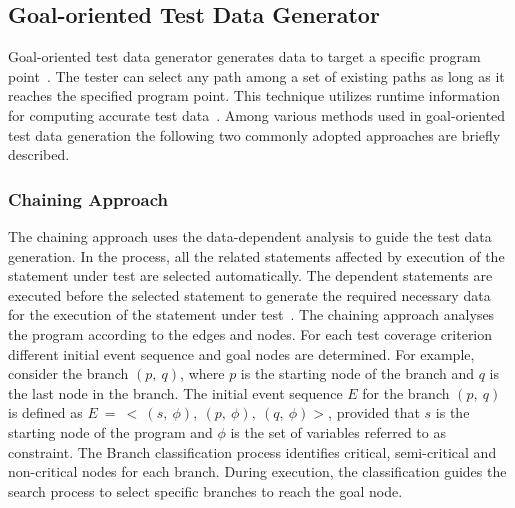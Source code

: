 

\subsection{Goal-oriented Test Data Generator}
\label{sec:goaloriented_2}
Goal-oriented test data generator generates data to target a specific program point~\cite{chungautomated}. The tester can select any path among a set of existing paths as long as it reaches the specified program point. This technique utilizes runtime information for computing accurate test data~\cite{ferguson1996chaining}. Among various methods used in goal-oriented test data generation the following two commonly adopted approaches are briefly described.

\subsubsection{Chaining Approach}
The chaining approach uses the data-dependent analysis to guide the test data generation. In the process, all the related statements affected by execution of the statement under test are selected automatically. The dependent statements are executed before the selected statement to generate the required necessary data for the execution of the statement under test~\cite{ferguson1996chaining}. The chaining approach analyses the program according to the edges and nodes. For each test coverage criterion different initial event sequence and goal nodes are determined. For example, consider  the branch $(p,~q)$, where $p$ is  the starting node of the branch and $q$ is the last node in the branch. The initial event sequence $E$ for the branch $(p,~q)$ is defined as $E~=~<~(s,~\phi),~(p,~\phi),~(q,~\phi) >$, provided that $s$ is the starting node of the program and $\phi$ is the set of variables referred to as constraint. The Branch classification process identifies critical, semi-critical and non-critical nodes for each branch. During execution, the classification guides the search process to select specific branches to reach the goal node.  

